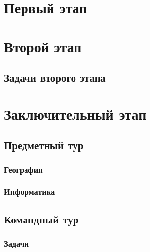 \documentclass[a4paper,12pt,oneside]{book}
\begin{document}

\setcounter{tocdepth}{1}

\tableofcontents

\part{Первый этап}




\part{Второй этап}
\clearpage
\chapter{Задачи второго этапа}



\part{Заключительный этап}

\clearpage
\chapter{Предметный тур}

\section{География}


\section{Информатика}


\chapter{Командный тур}
\section{Задачи}
\end{document}
